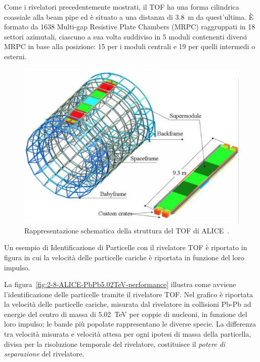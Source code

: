     Come i rivelatori precedentemente mostrati, il TOF ha una forma cilindrica coassiale alla beam pipe ed è situato a una distanza di \qty{3.8}{\meter} da quest’ultima. È formato da 1638 Multi-gap Resistive Plate Chambers (MRPC) raggruppati in 18 settori azimutali, ciascuno a sua volta suddiviso in 5 moduli contenenti diversi MRPC in base alla posizione: 15 per i moduli centrali e 19 per quelli intermedi o esterni.

    \begin{figure}[h]
        \centering
        \includegraphics[width=0.62\linewidth]{res/fig/2-chapter/7-ALICE-TOF.eps}
        \caption{Rappresentazione schematica della struttura del TOF di ALICE~\cite{ALICE_TOF_2017}.}
        \label{fig:2-7-ALICE-TOF}
    \end{figure}

    Un esempio di Identificazione di Particelle con il rivelatore TOF è riportato in figura in cui la velocità delle particelle cariche è riportata in funzione del loro impulso.

    La figura~\ref{fig:2-8-ALICE-PbPb5.02TeV-performance} illustra come avviene l'identificazione delle particelle tramite il rivelatore TOF. Nel grafico è riportata la velocità delle particelle cariche, misurata dal rivelatore in collisioni Pb-Pb ad energie del centro di massa di \qty{5.02}{\tera \eV} per coppie di nucleoni, in funzione del loro impulso; le bande più popolate rappresentano le diverse specie. La differenza tra velocità misurata e velocità attesa per ogni ipotesi di massa della particella, divisa per la risoluzione temporale del rivelatore, costituisce il \textit{potere di separazione} del rivelatore.

